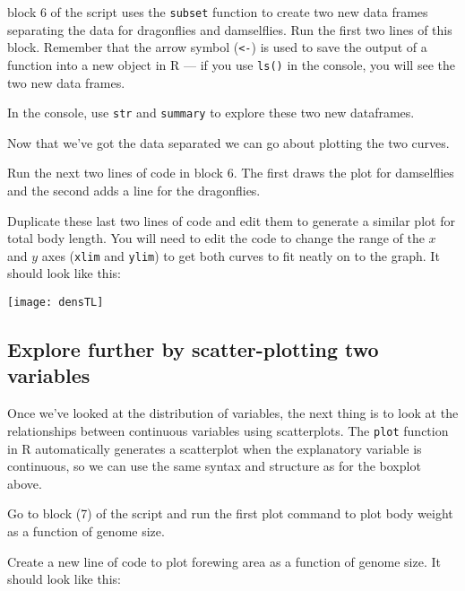 \begin{compactitem}[$\quad\star$]
\item block 6 of the script uses the {\tt subset} function to create 
two new data frames separating the data for dragonflies and 
damselflies. Run the first two lines of this block. Remember that the 
arrow symbol ({\tt <-}) is used to save the output of a function into a 
new object in R --- if you use {\tt ls()} in the console, you will see 
the two new data frames.
\item In the console, use {\tt str} and {\tt summary} to explore these 
two new dataframes.
\end{compactitem}
Now that we've got the data separated we can go about plotting the two 
curves. 
\begin{compactitem}[$\quad\star$]
\item Run the next two lines of code in block 6. The first draws the 
plot for damselflies and the second adds a line for the dragonflies. 
\item Duplicate these last two lines of code and edit them to generate 
a similar plot for total body length. You will need to edit the code to 
change the range of the $x$ and $y$ axes ({\tt xlim} and {\tt ylim}) to 
get both curves to fit neatly on to the graph. It should look like 
this:
\end{compactitem}

\begin{center}
    \texttt{[image: densTL]} 
\end{center}

\subsection{Explore further by scatter-plotting two variables}
 
Once we've looked at the distribution of variables, the next thing is 
to look at the relationships between continuous variables using 
scatterplots. The {\tt plot} function in R automatically generates a 
scatterplot when the explanatory variable is continuous, so we can use 
the same syntax and structure as for the boxplot above.
 
\begin{compactitem}[$\quad\star$]
\item Go to block (7) of the script and run the first plot command to 
plot body weight as a function of genome size.
\item Create a new line of code to plot forewing area as a function of 
genome size. It should look like this:
\end{compactitem}

